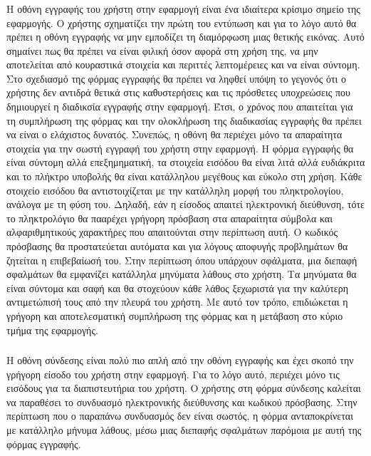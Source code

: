\subsubsection{}
Η οθόνη εγγραφής του χρήστη στην εφαρμογή είναι ένα ιδιαίτερα κρίσιμο σημείο της εφαρμογής. Ο χρήστης σχηματίζει την πρώτη του εντύπωση και για το λόγο αυτό θα πρέπει η οθόνη εγγραφής να μην εμποδίζει τη διαμόρφωση μιας θετικής εικόνας. Αυτό σημαίνει πως θα πρέπει να είναι φιλική όσον αφορά στη χρήση της, να μην αποτελείται από κουραστικά στοιχεία και περιττές λεπτομέρειες και να είναι σύντομη. Στο σχεδιασμό της φόρμας εγγραφής θα πρέπει να ληφθεί υπόψη το γεγονός ότι ο χρήστης δεν αντιδρά θετικά στις καθυστερήσεις και τις πρόσθετες υποχρεώσεις που δημιουργεί η διαδικσία εγγραφής στην εφαρμογή. Έτσι, ο χρόνος που απαιτείται για τη συμπλήρωση της φόρμας και την ολοκλήρωση της διαδικασίας εγγραφής θα πρέπει να είναι ο ελάχιστος δυνατός. \newline
\indent
Συνεπώς, η οθόνη θα περιέχει μόνο τα απαραίτητα στοιχεία για την σωστή εγγραφή του χρήστη στην εφαρμογή. Η φόρμα εγγραφής θα είναι σύντομη αλλά επεξημηματική, τα στοιχεία εισόδου θα είναι λιτά αλλά ευδιάκριτα και το πλήκτρο υποβολής θα είναι κατάλληλου μεγέθους και εύκολο στη χρήση. Κάθε στοιχείο εισόδου θα αντιστοιχίζεται με την κατάλληλη μορφή του πληκτρολογίου, ανάλογα με τη φύση του. Δηλαδή, εάν η είσοδος απαιτεί ηλεκτρονική διεύθυνση, τότε το πληκτρολόγιο θα πααρέχει γρήγορη πρόσβαση στα απαραίτητα σύμβολα και αλφαριθμητικούς χαρακτήρες που απαιτούνται στην περίπτωση αυτή. Ο κωδικός πρόσβασης θα προστατεύεται αυτόματα και για λόγους αποφυγής προβλημάτων θα ζητείται η επιβεβαίωσή του. \newline 
\indent
Στην περίπτωση όπου υπάρχουν σφάλματα, μια διεπαφή σφαλμάτων θα εμφανίζει κατάλληλα μηνύματα λάθους στο χρήστη. Τα μηνύματα θα είναι σύντομα και σαφή και θα στοχεύουν κάθε λάθος ξεχωριστά για την καλύτερη αντιμετώπισή τους από την πλευρά του χρήστη. Με αυτό τον τρόπο, επιδιώκεται η γρήγορη και αποτελεσματική συμπλήρωση της φόρμας και η μετάβαση στο κύριο τμήμα της εφαρμογής.


\subsubsection{}
Η οθόνη σύνδεσης είναι πολύ πιο απλή από την οθόνη εγγραφής και έχει σκοπό την γρήγορη είσοδο του χρήστη στην εφαρμογή. Για το λόγο αυτό, περιέχει μόνο τις εισόδους για τα διαπιστευτήρια του χρήστη. Ο χρήστης στη φόρμα σύνδεσης καλείται να παραθέσει το συνδυασμό ηλεκτρονικής διεύθυνσης και κωδικού πρόσβασης. Στην περίπτωση που ο παραπάνω συνδυασμός δεν είναι σωστός, η φόρμα ανταποκρίνεται με κατάλληλο μήνυμα λάθους, μέσω μιας διεπαφής σφαλμάτων παρόμοια με αυτή της φόρμας εγγραφής.

